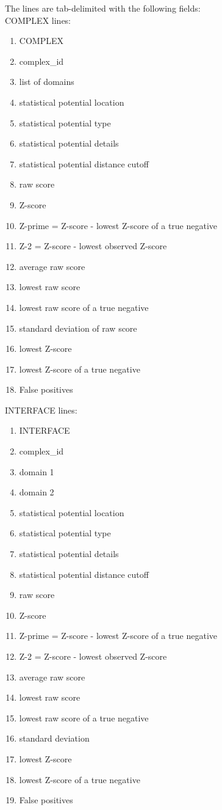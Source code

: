 \documentclass[11pt]{article}
\begin{document}
The lines are tab-delimited with the following fields:\\
COMPLEX lines:
\begin{enumerate}
   \item COMPLEX
   \item complex\_id
   \item list of domains
   \item statistical potential location
   \item statistical potential type
   \item statistical potential details
   \item statistical potential distance cutoff
   \item raw score
   \item Z-score
   \item Z-prime = Z-score - lowest Z-score of a true negative
   \item Z-2 = Z-score - lowest observed Z-score
   \item average raw score
   \item lowest raw score
   \item lowest raw score of a true negative
   \item standard deviation of raw score
   \item lowest Z-score
   \item lowest Z-score of a true negative
   \item False positives
\end{enumerate}

INTERFACE lines:
\begin{enumerate}
   \item INTERFACE
   \item complex\_id
   \item domain 1
   \item domain 2
   \item statistical potential location
   \item statistical potential type
   \item statistical potential details
   \item statistical potential distance cutoff
   \item raw score
   \item Z-score
   \item Z-prime = Z-score - lowest Z-score of a true negative
   \item Z-2 = Z-score - lowest observed Z-score
   \item average raw score
   \item lowest raw score
   \item lowest raw score of a true negative
   \item standard deviation
   \item lowest Z-score
   \item lowest Z-score of a true negative
   \item False positives
\end{enumerate}
\end{document}
